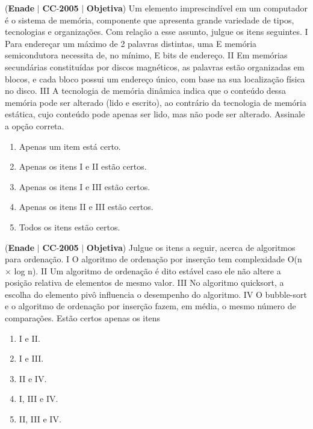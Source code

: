 \documentclass{exam}
\begin{document}
\begin{questions}
\question (\textbf{Enade} $|$ \textbf{CC}-\textbf{2005} $|$ \textbf{Objetiva})
Um elemento imprescindível em um computador é o sistema de
memória, componente que apresenta grande variedade de tipos,
tecnologias e organizações. Com relação a esse assunto, julgue
os itens seguintes.
I Para endereçar um máximo de 2 palavras distintas, uma
E
memória semicondutora necessita de, no mínimo, E bits de
endereço.
II Em memórias secundárias constituídas por discos
magnéticos, as palavras estão organizadas em blocos, e cada
bloco possui um endereço único, com base na sua
localização física no disco.
III A tecnologia de memória dinâmica indica que o conteúdo
dessa memória pode ser alterado (lido e escrito), ao
contrário da tecnologia de memória estática, cujo conteúdo
pode apenas ser lido, mas não pode ser alterado.
Assinale a opção correta.
	\begin{enumerate}[label=\alph*)]
		\item  Apenas um item está certo.
		\item  Apenas os itens I e II estão certos.
		\item  Apenas os itens I e III estão certos.
		\item  Apenas os itens II e III estão certos.
		\item  Todos os itens estão certos.
	\end{enumerate}

\question (\textbf{Enade} $|$ \textbf{CC}-\textbf{2005} $|$ \textbf{Objetiva})
Julgue os itens a seguir, acerca de algoritmos para ordenação.
I O algoritmo de ordenação por inserção tem complexidade
O(n × log n).
II Um algoritmo de ordenação é dito estável caso ele não altere
a posição relativa de elementos de mesmo valor.
III No algoritmo quicksort, a escolha do elemento pivô
influencia o desempenho do algoritmo.
IV O bubble-sort e o algoritmo de ordenação por inserção
fazem, em média, o mesmo número de comparações.
Estão certos apenas os itens
	\begin{enumerate}[label=\alph*)]
		\item  I e II.
		\item  I e III.
		\item  II e IV.
		\item  I, III e IV.
		\item  II, III e IV.
	\end{enumerate}


\end{questions}
\end{document}
